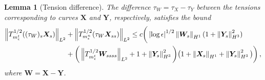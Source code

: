 \documentclass[10pt,a4paper]{amsart}
\newtheorem{lemma}{Lemma}
\newcommand{\X}{\bm{X}}
\newcommand{\Y}{\bm{Y}}
\newcommand{\abs}[1]{\left\lvert #1 \right\rvert}
\newcommand{\norm}[1]{\left\lVert #1 \right\rVert}
\begin{document}
\begin{lemma}[Tension difference]\label{lem:tensionXY_diff}
  The difference $\tau_W=\tau_X-\tau_Y$ between the tensions corresponding to curves $\X$ and $\Y$, respectively, satisfies the bound 
\begin{equation}\label{eq:tauWbd}
\begin{aligned}
  \norm{T_{m_\epsilon^{\rm t}}^{1/2}((\tau_W)_s\X_s)}_{L^2} &+ 
  \norm{T_{m_\epsilon^{\rm n}}^{1/2}(\tau_W\X_{ss})}_{L^2}
  \le c\bigg(\abs{\log\epsilon}^{1/2}\norm{\bm{W}_s}_{H^1}(1+\norm{\Y_s}_{H^3}^2)\\
  & + \bigg(\norm{T_{m_\epsilon^{\rm t}}^{1/2}\bm{W}_{ssss}}_{L^2}+ 1+\norm{\Y_s}_{H^3}^2\bigg)\big(1+\norm{\X_s}_{H^1}+\norm{\Y_s}_{H^3}^2\big)\bigg)\,,
\end{aligned}
\end{equation}
where $\bm{W}=\X-\Y$.
\end{lemma}
\end{document}
